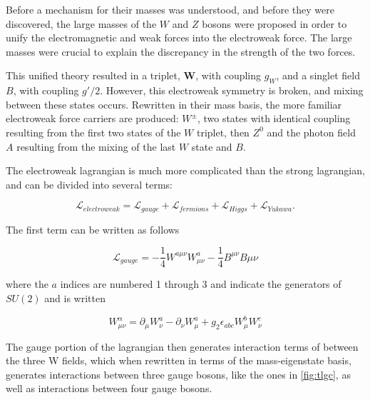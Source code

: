 Before a mechanism for their masses was understood, and before they were discovered, the large masses of the $W$ and $Z$ bosons were proposed in order to unify the electromagnetic and weak forces into the electroweak force. The large masses were crucial to explain the discrepancy in the strength of the two forces. 

This unified theory resulted in a triplet, $\bm{W}$, with coupling $g_W$, and a singlet field $B$, with coupling $g'/2$. However, this electroweak symmetry is broken, and mixing between these states occurs. Rewritten in their mass basis, the more familiar electroweak force carriers are produced: $W^\pm$, two states with identical coupling resulting from the first two states of the $W$ triplet, then $Z^0$ and the photon field $A$ resulting from the mixing of the last $W$ state and $B$. 

The electroweak lagrangian is much more complicated than the strong lagrangian, and can be divided into several terms:

\begin{equation}
\mathcal{L}_{electroweak} = \mathcal{L}_{gauge} + \mathcal{L}_{fermions} + \mathcal{L}_{Higgs} + \mathcal{L}_{Yukawa} .
\end{equation}

The first term can be written as follows

\begin{equation}
\mathcal{L}_{gauge} = -\frac{1}{4}W^{a\mu\nu}W^a_{\mu\nu} - \frac{1}{4}B^{\mu\nu}B{\mu\nu} 
\end{equation}

where the $a$ indices are numbered 1 through 3 and indicate the generators of $SU(2)$ and is written 

\begin{equation}
W^\alpha_{\mu\nu} = \partial_\mu W^a_\nu - \partial_\nu W^a_\mu + g_2 \epsilon_{abc} W^b_\mu W^c_\nu
\end{equation}

The gauge portion of the lagrangian then generates interaction terms of between the three W fields, which when rewritten in terms of the mass-eigenstate basis, generates interactions between three gauge bosons, like the ones in \autoref{fig:tlgc}, as well as interactions between four gauge bosons.

